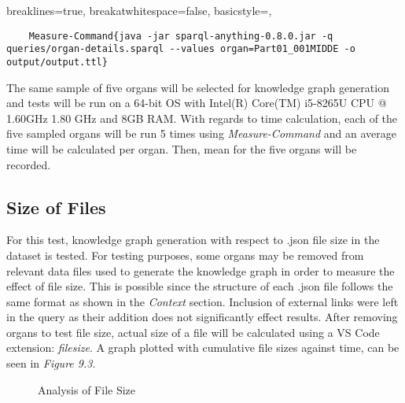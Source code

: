 \lstset
{
    breaklines=true,
    breakatwhitespace=false,
    basicstyle=\ttfamily,
}
\begin{lstlisting}
    Measure-Command{java -jar sparql-anything-0.8.0.jar -q queries/organ-details.sparql --values organ=Part01_001MIDDE -o output/output.ttl}
\end{lstlisting}

The same sample of five organs will be selected for knowledge graph generation and tests will be run on a 64-bit OS with Intel(R) Core(TM) i5-8265U CPU @ 1.60GHz 1.80 GHz and 8GB RAM. With regards to time calculation, each of the five sampled organs will be run 5 times using \textit{Measure-Command} and an average time will be calculated per organ. Then, mean for the five organs will be recorded.

\subsection{Size of Files}
\hspace{0.5cm} For this test, knowledge graph generation with respect to .json file size in the dataset is tested. For testing purposes, some organs may be removed from relevant data files used to generate the knowledge graph in order to measure the effect of file size. This is possible since the structure of each .json file follows the same format as shown in the \textit{Context} section. Inclusion of external links were left in the query as their addition does not significantly effect results. After removing organs to test file size, actual size of a file will be calculated using a VS Code extension: \textit{filesize}. A graph plotted with cumulative file sizes against time, can be seen in \textit{Figure 9.3}.

\begin{figure}[H]
\begin{center}
\end{center}
\vspace{-0.75cm}
\caption{Analysis of File Size}
\end{figure}



